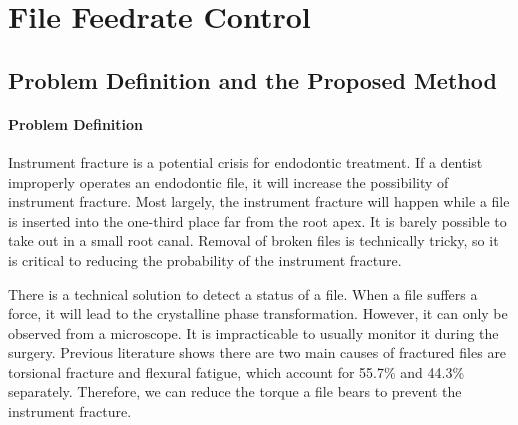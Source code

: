 \chapter{File Feedrate Control}
\label{chapter5}
\section{Problem Definition and the Proposed Method}
\subsubsection{Problem Definition}
\hspace*{6mm}Instrument fracture is a potential crisis for endodontic treatment. If a dentist improperly operates an endodontic file, it will increase the possibility of instrument fracture. Most largely, the instrument fracture will happen while a file is inserted into the one-third place far from the root apex. It is barely possible to take out in a small root canal. Removal of broken files is technically tricky, so it is critical to reducing the probability of the instrument fracture.
\par

There is a technical solution to detect a status of a file. When a file suffers a force, it will lead to the crystalline phase transformation. However, it can only be observed from a microscope. It is impracticable to usually monitor it during the surgery. Previous literature shows there are two main causes of fractured files are torsional fracture and flexural fatigue, which account for 55.7\% and 44.3\% separately\cite{SATTAPAN2000161}. Therefore, we can reduce the torque a file bears to prevent the instrument fracture.
